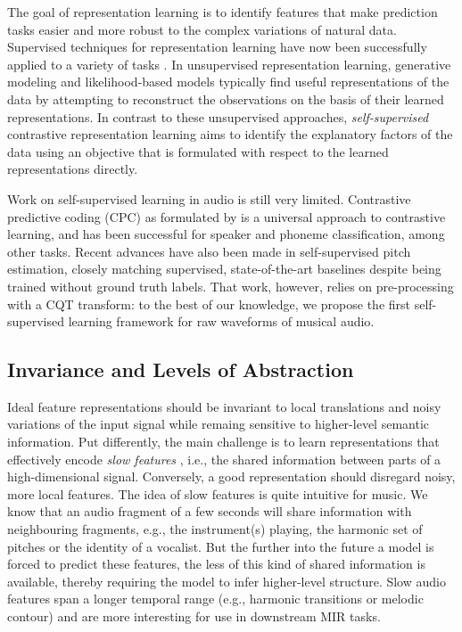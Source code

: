 \documentclass{report}
\begin{document}
The goal of representation learning is to identify features that make  prediction tasks easier and more robust to the complex variations of natural data\cite{bengio2013representation}. Supervised techniques for representation learning have now been successfully applied to a variety of tasks \cite{korzeniowski_fully_2016, chen_harmony_2019, korzeniowski_end--end_2017, bock_joint_2016, pons_end--end_2017, van_den_oord_deep_2013}. 
In unsupervised representation learning, generative modeling and likelihood-based models typically find useful representations of the data by attempting to reconstruct the observations on the basis of their learned representations\cite{goodfellow2014generative, unsupervised_gan}.
In contrast to these unsupervised approaches, \emph{self-supervised} contrastive representation learning aims to identify the explanatory factors of the data using an objective that is formulated with respect to the learned representations directly.

Work on self-supervised learning in audio is still very limited. Contrastive predictive coding (CPC) as formulated by \cite{oord_representation_2019} is a universal approach to contrastive learning, and has been successful for speaker and phoneme classification, among other tasks. Recent advances have also been made in self-supervised pitch estimation\cite{spice}, closely matching supervised, state-of-the-art baselines despite being trained without ground truth labels. That work, however, relies on pre-processing with a CQT transform: to the best of our knowledge, we propose the first self-supervised learning framework for raw waveforms of musical audio. 

\subsection{Invariance and Levels of Abstraction}
Ideal feature representations should be invariant to local translations and noisy variations of the input signal while remaing sensitive to higher-level semantic information. Put differently, the main challenge is to learn representations that effectively encode \textit{slow features} \cite{wiskott_slow_2002}, i.e., the shared information between parts of a high-dimensional signal. Conversely, a good representation should disregard noisy, more local features. The idea of slow features is quite intuitive for music.
We know that an audio fragment of a few seconds will share information with neighbouring fragments, e.g., the instrument(s) playing, the harmonic set of pitches or the identity of a vocalist.  But the further into the future a model is forced to predict these features, the less of this kind of shared information is available, thereby requiring the model to infer higher-level structure. Slow audio features span a longer temporal range (e.g., harmonic transitions or melodic contour) and are more interesting for use in downstream MIR tasks.
\end{document}
